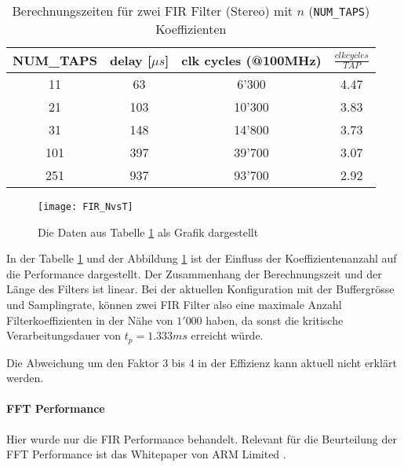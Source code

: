 \begin{table}[H]
	\centering
	\begin{tabular}{|c|c|c|c|}
		\hline
		\textbf{NUM\_TAPS} & \textbf{delay {[}$\mu s${]}} & \textbf{clk cycles (@100MHz)} & \textbf{$\frac{\si{clk cycles}}{\si{TAP}}$} \\ \hline
		11                 & 63                      & 6'300                          & 4.47                       \\ \hline
		21                 & 103                     & 10'300                         & 3.83                       \\ \hline
		31                 & 148                     & 14'800                         & 3.73                       \\ \hline
		101                & 397                     & 39'700                         & 3.07                       \\ \hline
		251                & 937                     & 93'700                         & 2.92                       \\ \hline
	\end{tabular}
	\caption{Berechnungszeiten für zwei FIR Filter (Stereo) mit $n$ (\texttt{NUM\_TAPS}) Koeffizienten}
	\label{tab:FIR_performance}
\end{table}


\begin{figure}[H]
	\centering
	\texttt{[image: FIR\_NvsT]}
	\caption{Die Daten aus Tabelle \ref{tab:FIR_performance} als Grafik dargestellt}
	\label{pic:FIR_NvsT}
\end{figure}


In der Tabelle \ref{tab:FIR_performance} und der Abbildung \ref{pic:FIR_NvsT} ist der Einfluss der Koeffizientenanzahl auf die Performance dargestellt.
Der Zusammenhang der Berechnungszeit und der Länge des Filters ist linear.
Bei der aktuellen Konfiguration mit der Buffergrösse und Samplingrate, können zwei FIR Filter also eine maximale Anzahl Filterkoeffizienten in der Nähe von $1'000$ haben, da sonst die kritische Verarbeitungsdauer von $t_{p}=1.333\si{ms}$ erreicht würde.

Die Abweichung um den Faktor 3 bis 4 in der Effizienz kann aktuell nicht erklärt werden.

\paragraph{FFT Performance}

Hier wurde nur die FIR Performance behandelt. Relevant für die Beurteilung der FFT Performance ist das Whitepaper von ARM Limited \cite{ARM-Performance-Whitepaper}.

